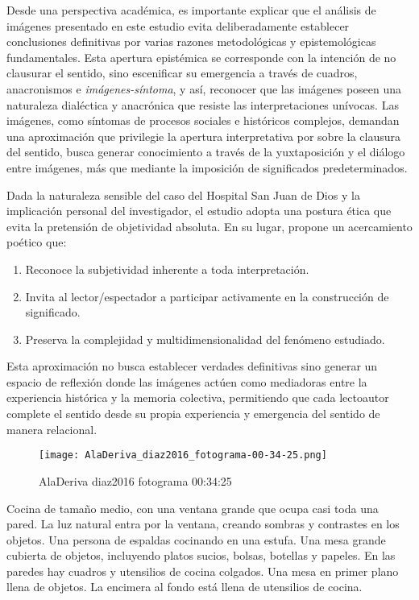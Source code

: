Desde una perspectiva académica, es importante explicar que el análisis de imágenes presentado en este estudio evita deliberadamente establecer conclusiones definitivas por varias razones metodológicas y epistemológicas fundamentales. \textcolor{edit30sept}{Esta apertura epistémica se corresponde con la intención de no clausurar el sentido, sino escenificar su emergencia a través de cuadros, anacronismos e \textit{imágenes-síntoma},} y así, reconocer que las imágenes poseen una naturaleza dialéctica y anacrónica que resiste las interpretaciones unívocas. Las imágenes, como síntomas de procesos sociales e históricos complejos, demandan una aproximación que privilegie la apertura interpretativa por sobre la clausura del sentido, busca generar conocimiento a través de la yuxtaposición y el diálogo entre imágenes, más que mediante la imposición de significados predeterminados.

Dada la naturaleza sensible del caso del Hospital San Juan de Dios y la implicación personal del investigador, el estudio adopta una postura ética que evita la pretensión de objetividad absoluta. En su lugar, propone un acercamiento poético que:

\begin{enumerate}
    \item Reconoce la subjetividad inherente a toda interpretación.
    \item Invita al lector/espectador a participar activamente en la construcción de significado.
    \item Preserva la complejidad y multidimensionalidad del fenómeno estudiado.
\end{enumerate}

Esta aproximación no busca establecer verdades definitivas sino generar un espacio de reflexión donde las imágenes actúen como mediadoras entre la experiencia histórica y la memoria colectiva, permitiendo que cada lectoautor complete el sentido desde su propia experiencia y emergencia del sentido de manera relacional.


\clearpage
\begin{figure}[h!]
    \centering
    \texttt{[image: AlaDeriva\_diaz2016\_fotograma-00-34-25.png]}
    \caption{AlaDeriva diaz2016 fotograma 00:34:25}
    \label{fig:AlaDeriva_diaz2016_fotograma_00_34_25}
\end{figure}

Cocina de tamaño medio, con una ventana grande que ocupa casi toda una pared. La luz natural entra por la ventana, creando sombras y contrastes en los objetos. Una persona de espaldas cocinando en una estufa. Una mesa grande cubierta de objetos, incluyendo platos sucios, bolsas, botellas y papeles. En las paredes hay cuadros y utensilios de cocina colgados. Una mesa en primer plano llena de objetos. La encimera al fondo está llena de utensilios de cocina. \parencite[fotograma: 00:34:25]{AlaDerivaDiaz2016}

